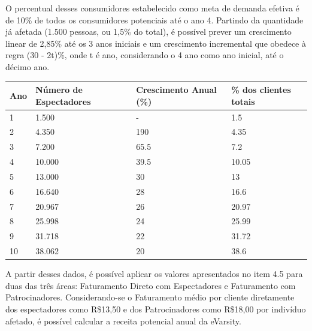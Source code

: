 \documentclass[a4paper, 12pt]{paper}
\begin{document}
O percentual desses consumidores estabelecido como meta de demanda efetiva é de 10\% de todos os consumidores potenciais até o ano 4. Partindo da quantidade já afetada (1.500 pessoas, ou 1,5\% do total), é possível prever um crescimento linear de 2,85\% até os 3 anos iniciais e um crescimento incremental que obedece à regra (30 - 2t)\%, onde t é ano, considerando o 4 ano como ano inicial, até o décimo ano.

\begin{table}[ht]
	\centering
	\begin{tabular}{p{1cm}p{4.5cm}p{4.2cm}p{4cm}}
		\hline
		\cellcolor{gray}Ano&\cellcolor{gray}Número de Espectadores&\cellcolor{gray}Crescimento Anual (\%)&\cellcolor{gray}\% dos clientes totais\\
		\hline
		1&1.500&-&1.5\\
		2&4.350&190&4.35\\
		3&7.200&65.5&7.2\\	
		4&10.000&39.5&10.05\\
		5&13.000&30&13\\
		6&16.640&28&16.6\\
		7&20.967&26&20.97\\
		8&25.998&24&25.99\\
		9&31.718&22&31.72\\							
		10&38.062&20&38.6\\		
		\hline
	\end{tabular}
\end{table}

A partir desses dados, é possível aplicar os valores apresentados no item 4.5 para duas das três áreas: Faturamento Direto com Espectadores e Faturamento com Patrocinadores. Considerando-se o Faturamento médio por cliente diretamente dos espectadores como R\$13,50 e dos Patrocinadores como R\$18,00 por indivíduo afetado, é possível calcular a receita potencial anual da eVarsity.
\end{document}
